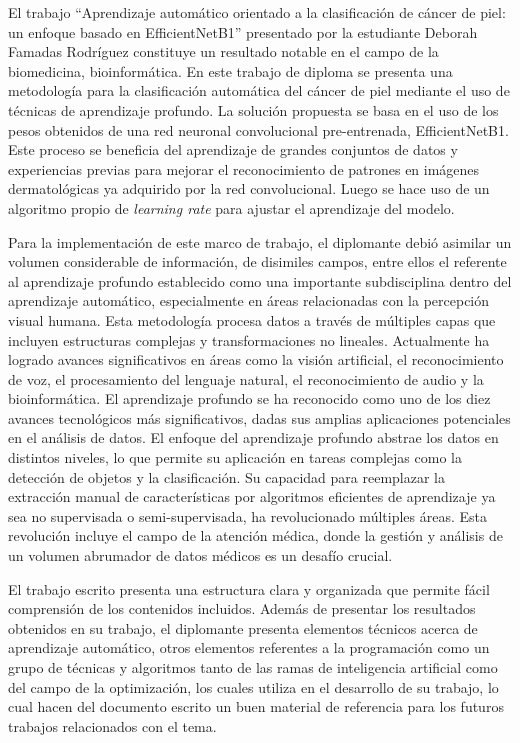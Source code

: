 \begin{opinion}

El trabajo “Aprendizaje automático orientado a la clasificación de cáncer de piel: un enfoque basado en EfficientNetB1” presentado por la estudiante Deborah Famadas Rodríguez constituye un resultado notable en el campo de la biomedicina, bioinformática. En este trabajo de diploma se presenta una metodología para la clasificación automática del cáncer de piel mediante el uso de técnicas de aprendizaje profundo. La solución propuesta se basa en el uso de los pesos obtenidos de una red neuronal convolucional pre-entrenada, EfficientNetB1. Este proceso se beneficia del aprendizaje de grandes conjuntos de datos y experiencias previas para mejorar el reconocimiento de patrones en imágenes dermatológicas ya adquirido por la red convolucional. Luego se hace uso de un algoritmo propio de \textit{learning rate} para ajustar el aprendizaje del modelo. 

Para la implementación de este marco de trabajo, el diplomante debió asimilar un volumen considerable de información, de disimiles campos, entre ellos el referente al aprendizaje profundo establecido como una importante subdisciplina dentro del aprendizaje automático, especialmente en áreas relacionadas con la percepción visual humana. Esta metodología procesa datos a través de múltiples capas que incluyen estructuras complejas y transformaciones no lineales. Actualmente ha logrado avances significativos en áreas como la visión artificial, el reconocimiento de voz, el procesamiento del lenguaje natural, el reconocimiento de audio y la bioinformática. El aprendizaje profundo se ha reconocido como uno de los diez avances tecnológicos más significativos, dadas sus amplias aplicaciones potenciales en el análisis de datos. El enfoque del aprendizaje profundo abstrae los datos en distintos niveles, lo que permite su aplicación en tareas complejas como la detección de objetos y la clasificación. Su capacidad para reemplazar la extracción manual de características por algoritmos eficientes de aprendizaje ya sea no supervisada o semi-supervisada, ha revolucionado múltiples áreas. Esta revolución incluye el campo de la atención médica, donde la gestión y análisis de un volumen abrumador de datos médicos es un desafío crucial.

El trabajo escrito presenta una estructura clara y organizada que permite fácil comprensión de los contenidos incluidos. Además de presentar los resultados obtenidos en su trabajo, el diplomante presenta elementos técnicos acerca de aprendizaje automático, otros elementos referentes a la programación como un grupo de técnicas y algoritmos tanto de las ramas de inteligencia artificial como del campo de la optimización, los cuales utiliza en el desarrollo de su trabajo, lo cual hacen del documento escrito un buen material de referencia para los futuros trabajos relacionados con el tema.


\end{opinion}
